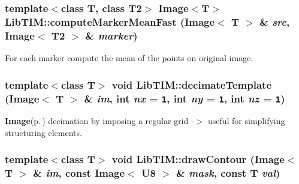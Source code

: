 \subsubsection{\setlength{\rightskip}{0pt plus 5cm}template$<$class T, class T2$>$ Image$<$T$>$ Lib\-TIM::compute\-Marker\-Mean\-Fast (Image$<$ T $>$ \& {\em src}, Image$<$ T2 $>$ \& {\em marker})}\label{group__misc_ga3}


For each marker compute the mean of the points on original image. 

\subsubsection{\setlength{\rightskip}{0pt plus 5cm}template$<$class T$>$ void Lib\-TIM::decimate\-Template (Image$<$ T $>$ \& {\em im}, int {\em nx} = {\tt 1}, int {\em ny} = {\tt 1}, int {\em nz} = {\tt 1})}\label{group__misc_ga4}


{\bf Image}{\rm (p.\,\pageref{classLibTIM_1_1Image})} decimation by imposing a regular grid -$>$ useful for simplifying structuring elements. 

\subsubsection{\setlength{\rightskip}{0pt plus 5cm}template$<$class T$>$ void Lib\-TIM::draw\-Contour (Image$<$ T $>$ \& {\em im}, const Image$<$ {\bf U8} $>$ \& {\em mask}, const T {\em val})}\label{group__misc_ga6}


